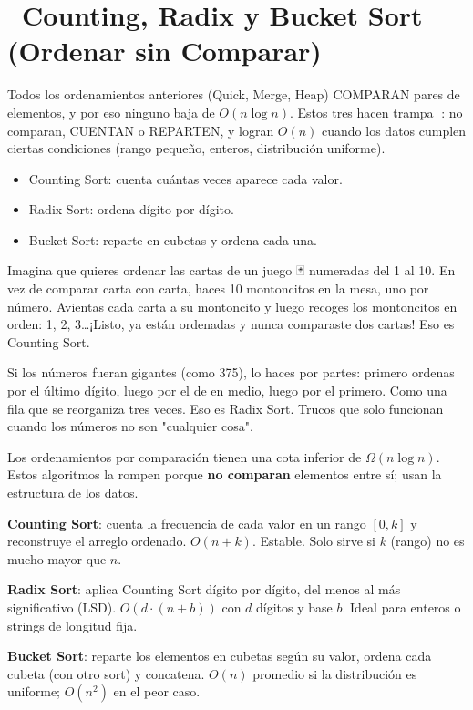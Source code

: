 \chapter[\emj{🪣}~Counting, Radix y Bucket Sort (No Comparación)]{~Counting, Radix y Bucket Sort (Ordenar sin Comparar)}

\begin{dsaquees}

Todos los ordenamientos anteriores (Quick, Merge, Heap) COMPARAN pares de
elementos, y por eso ninguno baja de $O(n \log n)$. Estos tres hacen
trampa 🎯: no comparan, CUENTAN o REPARTEN, y logran $O(n)$ cuando los
datos cumplen ciertas condiciones (rango pequeño, enteros, distribución
uniforme).

\begin{itemize}
\item Counting Sort: cuenta cuántas veces aparece cada valor.
\item Radix Sort: ordena dígito por dígito.
\item Bucket Sort: reparte en cubetas y ordena cada una.
\end{itemize}

\end{dsaquees}

\begin{dsanino}

Imagina que quieres ordenar las cartas de un juego 🃏 numeradas del 1 al
10. En vez de comparar carta con carta, haces 10 montoncitos en la mesa,
uno por número. Avientas cada carta a su montoncito y luego recoges los
montoncitos en orden: 1, 2, 3\ldots ¡Listo, ya están ordenadas y nunca
comparaste dos cartas! Eso es Counting Sort.

Si los números fueran gigantes (como 375), lo haces por partes: primero
ordenas por el último dígito, luego por el de en medio, luego por el
primero. Como una fila que se reorganiza tres veces. Eso es Radix Sort.
Trucos que solo funcionan cuando los números no son "cualquier cosa".

\end{dsanino}

\begin{dsaotraforma}

Los ordenamientos por comparación tienen una cota inferior de
$\Omega(n \log n)$. Estos algoritmos la rompen porque \textbf{no comparan}
elementos entre sí; usan la estructura de los datos.

\textbf{Counting Sort}: cuenta la frecuencia de cada valor en un rango
$[0, k]$ y reconstruye el arreglo ordenado. $O(n + k)$. Estable. Solo
sirve si $k$ (rango) no es mucho mayor que $n$.

\textbf{Radix Sort}: aplica Counting Sort dígito por dígito, del menos al
más significativo (LSD). $O(d \cdot (n + b))$ con $d$ dígitos y base $b$.
Ideal para enteros o strings de longitud fija.

\textbf{Bucket Sort}: reparte los elementos en cubetas según su valor,
ordena cada cubeta (con otro sort) y concatena. $O(n)$ promedio si la
distribución es uniforme; $O(n^2)$ en el peor caso.

\end{dsaotraforma}

